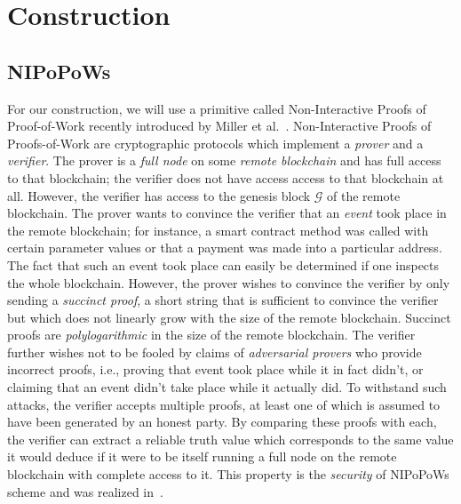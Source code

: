 \section{Construction}
\subsection*{NIPoPoWs}
For our construction, we will use a primitive called Non-Interactive Proofs of
Proof-of-Work recently introduced by Miller et al.~\cite{nipopows}.
Non-Interactive Proofs of Proofs-of-Work are cryptographic protocols which
implement a \emph{prover} and a \emph{verifier}. The prover is a \emph{full
node} on some \emph{remote blockchain} and has full access to that blockchain;
the verifier does not have access access to that blockchain at all. However, the
verifier has access to the genesis block $\mathcal{G}$ of the remote blockchain.
The prover wants to convince the verifier that an \emph{event} took place in the
remote blockchain; for instance, a smart contract method was called with certain
parameter values or that a payment was made into a particular address. The fact
that such an event took place can easily be determined if one inspects the whole
blockchain. However, the prover wishes to convince the verifier by only sending
a \emph{succinct proof}, a short string that is sufficient to convince the
verifier but which does not linearly grow with the size of the remote
blockchain. Succinct proofs are \emph{polylogarithmic} in the size of the remote
blockchain. The verifier further wishes not to be fooled by claims of
\emph{adversarial provers} who provide incorrect proofs, i.e., proving that
event took place while it in fact didn't, or claiming that an event didn't take
place while it actually did. To withstand such attacks, the verifier accepts
multiple proofs, at least one of which is assumed to have been generated by an
honest party. By comparing these proofs with each, the verifier can extract a
reliable truth value which corresponds to the same value it would deduce if it
were to be itself running a full node on the remote blockchain with complete
access to it. This property is the \emph{security} of NIPoPoWs scheme and was
realized in~\cite{nipopows}.

